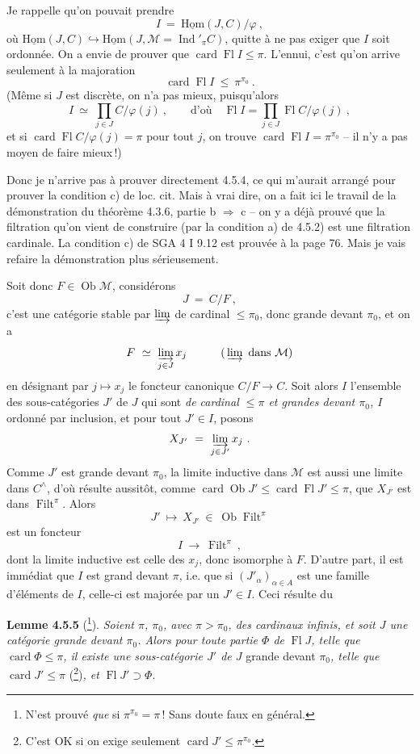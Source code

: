 \documentclass[11pt]{article}
\newcommand{\printedpage}[1]{\marginpar{\footnotesize p.~#1}}
\newcommand{\msp}[1]{\marginpar{\footnotesize [#1]}}
\newcommand{\card}{\operatorname{card}}
\newcommand{\Fl}{\operatorname{Fl}}
\newcommand{\Ob}{\operatorname{Ob}}
\newcommand{\Ind}{\operatorname{Ind}}
\newcommand{\Filt}{\operatorname{Filt}}
\newcommand{\uHom}{\underline{\mathrm{Hom}}}
\begin{document}
\msp{page 111}

Je rappelle qu'on pouvait prendre
\[
I \ =\ \uHom(J,C)/\varphi\ ,
\]
où $\uHom(J,C) \hookrightarrow \uHom(J, \mathcal{M} = \Ind'_{\pi}C)$, quitte à ne pas exiger que $I$ soit ordonnée. On a envie de prouver que $\card\Fl I \leqslant \pi$. L'ennui, c'est qu'on arrive seulement à la majoration
\[
\card\Fl I \ \leqslant\ \pi^{\pi_0}\ .
\]
(Même si $J$ est discrète, on n'a pas mieux, puisqu'alors
\[
I \ \simeq\ \prod_{j\in J} C/\varphi(j)\ , \qquad \text{d'où} \quad \Fl I = \prod_{j\in J} \Fl C/\varphi(j)\ ,
\]
et si $\card\Fl C/\varphi(j) = \pi$ pour tout $j$, on trouve $\card\Fl I = \pi^{\pi_0}$ -- il n'y a pas moyen de faire mieux\,!)

Donc je n'arrive pas à prouver directement 4.5.4, ce qui m'aurait arrangé pour prouver la condition c) de loc. cit. Mais à vrai dire, on a fait ici le travail de la démonstration du théorème 4.3.6, partie b $\Longrightarrow$ c -- on y a déjà prouvé que la filtration qu'on vient de construire (par la condition a) de 4.5.2) est une filtration cardinale. La condition c) de SGA 4 I 9.12 est prouvée à la page 76. Mais je vais refaire
\msp{page 112}
la démonstration plus sérieusement.

Soit donc $F \in \Ob\mathcal{M}$, considérons
\[
J \ =\ C/F\ ,
\]
c'est une catégorie stable par $\varinjlim$ de cardinal $\leqslant \pi_0$, donc grande devant $\pi_0$, et on a
\[
F \ \simeq\ \varinjlim_{j\in J} x_j \qquad\quad (\,\varinjlim \ \text{dans } \mathcal{M})
\]
\printedpage{32}
en désignant par $j \longmapsto x_j$ le foncteur canonique $C/F \longrightarrow C$. Soit alors $I$ l'ensemble des sous-catégories $J'$ de $J$ qui sont \textit{de cardinal $\leqslant \pi$ et grandes devant $\pi_0$, $I$} ordonné par inclusion, et pour tout $J' \in I$, posons
\[
X_{J'} \ =\ \varinjlim_{j\in J'} x_j\ .
\]
Comme $J'$ est grande devant $\pi_0$, la limite inductive dans $\mathcal{M}$ est aussi une limite dans $C^{\wedge}$, d'où résulte aussitôt, comme $\card\Ob J' \leqslant \card\Fl J' \leqslant \pi$, que $X_{J'}$ est dans $\Filt^{\pi}$. Alors
\[
J' \ \longmapsto\ X_{J'} \ \in\ \Ob\Filt^{\pi}
\]
est un foncteur
\[
I \ \longrightarrow\ \Filt^{\pi}\ ,
\]
dont la limite inductive est celle des $x_j$, donc isomorphe à $F$. D'autre part, il est immédiat que $I$ est grand devant $\pi$, i.e. que si $(J'_{\alpha})_{\alpha\in A}$ est
\msp{page 113}
une famille d'éléments de $I$, celle-ci est majorée par un $J' \in I$. Ceci résulte du

\textbf{Lemme 4.5.5} (\footnote{N'est prouvé \textit{que} si $\pi^{\pi_0} = \pi$\,! Sans doute faux en général.}). \textit{Soient $\pi$, $\pi_0$, avec $\pi > \pi_0$, des cardinaux infinis, et soit $J$ une catégorie grande devant $\pi_0$. Alors pour toute partie $\Phi$ de} $\Fl J$\textit{, telle que} $\card\Phi \leqslant \pi$\textit{, il existe une sous-catégorie $J'$ de $J$} grande devant $\pi_0$\textit{, telle que} $\card J' \leqslant \pi$ (\footnote{C'est OK si on exige seulement $\card J' \leqslant \pi^{\pi_0}$.})\textit{, et} $\Fl J' \supset \Phi$.
\end{document}
